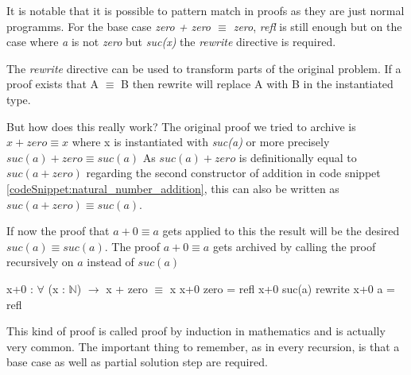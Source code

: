 It is notable that it is possible to pattern match in proofs as they are just normal programms. 
For the base case \emph{zero + zero $\equiv$ zero}, \emph{refl} is still enough but on the case where \emph{a} is not \emph{zero} but \emph{suc(x)} the \emph{rewrite} directive is required.

The \emph{rewrite} directive can be used to transform parts of the original problem. If a proof exists that A $\equiv$ B then rewrite will replace A with B in the instantiated type.

But how does this really work?
The original proof we tried to archive is $x + zero \equiv x$ where x is instantiated with \emph{suc(a)} or more precisely $suc(a) + zero \equiv suc(a)$
As $suc(a) + zero$ is definitionally equal to $suc(a + zero)$ regarding the second constructor of addition in code snippet \ref{codeSnippet:natural_number_addition}, this can also be written as $suc(a + zero) \equiv suc(a)$.

If now the proof that $a + 0 \equiv a$ gets applied to this the result will be the desired $suc(a) \equiv suc(a)$. The proof $a + 0 \equiv a$ gets archived by calling the proof recursively on $a$ instead of $suc(a)$

\begin{codesnippet}[mathescape=true, caption={Proof of addition to zero in Agda}, label={codeSnippet:x_plus_zero_agda}]
x+0 : $\forall$ (x : $\mathbb{N}$) $\rightarrow$ x + zero $\equiv$ x
x+0 zero = refl
x+0 suc(a) rewrite x+0 a = refl
\end{codesnippet}

This kind of proof is called proof by induction in mathematics and is actually very common.
The important thing to remember, as in every recursion, is that a base case as well as partial solution step are required.


